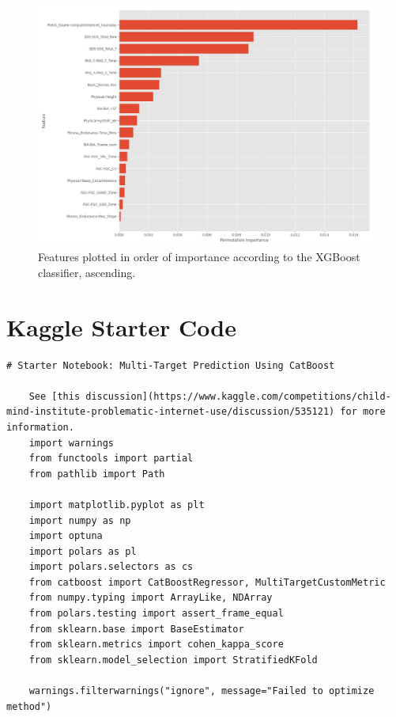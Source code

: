 \begin{appendices}
    \begin{figure}[h!]
        \centering
        \includegraphics[scale=0.4]{"./images/feature_importance.jpg"}
        \caption{Features plotted in order of importance according to the XGBoost classifier, ascending.}
      \end{figure}

    \pagebreak
    \section{Kaggle Starter Code \cite{antonina_dolgorukova_2024}}
    \begin{mdframed}
    \begin{lstlisting}[breaklines=true]
    # Starter Notebook: Multi-Target Prediction Using CatBoost

    See [this discussion](https://www.kaggle.com/competitions/child-mind-institute-problematic-internet-use/discussion/535121) for more information.
    import warnings
    from functools import partial
    from pathlib import Path

    import matplotlib.pyplot as plt
    import numpy as np
    import optuna
    import polars as pl
    import polars.selectors as cs
    from catboost import CatBoostRegressor, MultiTargetCustomMetric
    from numpy.typing import ArrayLike, NDArray
    from polars.testing import assert_frame_equal
    from sklearn.base import BaseEstimator
    from sklearn.metrics import cohen_kappa_score
    from sklearn.model_selection import StratifiedKFold

    warnings.filterwarnings("ignore", message="Failed to optimize method")


\end{lstlisting}
\end{mdframed}
\end{appendices}
